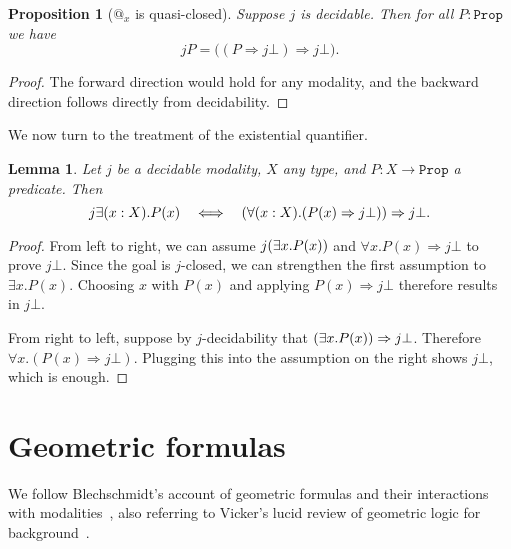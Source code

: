 \documentclass[reqno,11pt]{amsproc}
\makeatletter
\theoremstyle{plain}
\newtheorem{proposition}[theorem]{Proposition}
\newtheorem{lemma}[theorem]{Lemma}
\theoremstyle{definition}
\newcommand{\Const}[1]{\mathtt{#1}}
\renewcommand{\to}[1][]{\xrightarrow{#1}}
\newcommand{\prop}{\Const{Prop}}
\newcommand{\pt}{x}
\newcommand{\atsymbol}{{@}}
\newcommand{\at}[1][\pt]{\atsymbol_{#1}}
\newcommand{\imp}{\Rightarrow}
\let\originalleft\left
\let\originalright\right
\renewcommand{\left}{\mathopen{}\mathclose\bgroup\originalleft}
\renewcommand{\right}{\aftergroup\egroup\originalright}
\numberwithin{equation}{section}
\makeatother
\begin{document}
\begin{proposition}[$\at$ is quasi-closed]
Suppose $j$ is decidable. Then for all $P:\prop$ we have
\[j P=\big((P\imp j\bot)\imp j\bot\big).\]
\end{proposition}
\begin{proof}
The forward direction would hold for any modality, and the backward direction follows directly from decidability.
\end{proof}

We now turn to the treatment of the existential quantifier.

\begin{lemma}%
	Let $j$ be a decidable modality, $X$ any type, and $P : X \to \prop$ a predicate. Then
	\[
		j \exists (x : X) . P(x) \quad \Longleftrightarrow \quad \left( \forall (x : X). (P(x) \imp j \bot) \right) \imp j \bot.
	\]
\end{lemma}

\begin{proof}
	From left to right, we can assume $j \left( \exists x. P(x)\right)$ and $\forall x. P(x) \imp j\bot$ to prove $j\bot$. Since the goal is $j$-closed, we can strengthen the first assumption to $\exists x. P(x)$. Choosing $x$ with $P(x)$ and applying $P(x) \imp j\bot$ therefore results in $j\bot$.

	From right to left, suppose by $j$-decidability that $\left( \exists x. P(x) \right) \imp j\bot$. Therefore $\forall x. (P(x) \imp j\bot)$. Plugging this into the assumption on the right shows $j\bot$, which is enough.
\end{proof}




\section{Geometric formulas}

We follow Blechschmidt's account of geometric formulas and their interactions with modalities~\cite[Chapter~2~and~6]{blechschmidt2017internal}, also referring to Vicker's lucid review of geometric logic for background~\cite{vickers_geometric_logic}.

\clearpage



\end{document}
